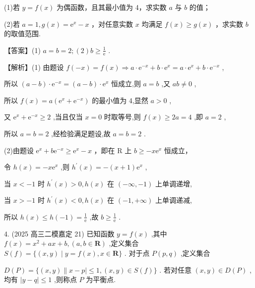 \documentclass[10pt]{article}
\begin{document}
(1)若 \(y = f\left( x\right)\) 为偶函数，且其最小值为 4，求实数 \(a\) 与 \(b\) 的值；

(2)若 \(a = 1,g\left( x\right)  = {\mathrm{e}}^{x} - x\) ，对任意实数 \(x\) 均满足 \(f\left( x\right)  \geq  g\left( x\right)\) ，求实数 \(b\) 的取值范围.

【答案】(1) \(a = b = 2;\left( 2\right) b \geq  \frac{1}{\mathrm{e}}\) .

【解析】(1) 由题设 \(f\left( {-x}\right)  = f\left( x\right)  \Rightarrow  a \cdot  {\mathrm{e}}^{-x} + b \cdot  {\mathrm{e}}^{x} = a \cdot  {\mathrm{e}}^{x} + b \cdot  {\mathrm{e}}^{-x}\) ,

所以 \(\left( {a - b}\right)  \cdot  {\mathrm{e}}^{-x} = \left( {a - b}\right)  \cdot  {\mathrm{e}}^{x}\) 恒成立,则 \(a = b\) ,又 \({ab} \neq  0\) ,

所以 \(f\left( x\right)  = a\left( {{\mathrm{e}}^{x} + {\mathrm{e}}^{-x}}\right)\) 的最小值为 4,显然 \(a > 0\) ,

又 \({\mathrm{e}}^{x} + {\mathrm{e}}^{-x} \geq  2\) ,当且仅当 \(x = 0\) 时取等号,则 \(f\left( x\right)  \geq  {2a} = 4\) ,即 \(a = 2\) ,

所以 \(a = b = 2\) ,经检验满足题设,故 \(a = b = 2\) .

(2)由题设 \({\mathrm{e}}^{x} + b{\mathrm{e}}^{-x} \geq  {\mathrm{e}}^{x} - x\) ，即在 \(\mathrm{R}\) 上 \(b \geq   - x{\mathrm{e}}^{x}\) 恒成立，

令 \(h\left( x\right)  =  - x{\mathrm{e}}^{x}\) ,则 \({h}^{\prime }\left( x\right)  =  - \left( {x + 1}\right) {\mathrm{e}}^{x}\) ,

当 \(x <  - 1\) 时 \({h}^{\prime }\left( x\right)  > 0,h\left( x\right)\) 在 \(\left( {-\infty , - 1}\right)\) 上单调递增,

当 \(x >  - 1\) 时 \({h}^{\prime }\left( x\right)  < 0,h\left( x\right)\) 在 \(\left( {-1, + \infty }\right)\) 上单调递减,

所以 \(h\left( x\right)  \leq  h\left( {-1}\right)  = \frac{1}{\mathrm{e}}\) ,故 \(b \geq  \frac{1}{\mathrm{e}}\) .

4. (2025 高三二模嘉定 21) 已知函数 \(y = f\left( x\right)\) ,其中 \(f\left( x\right)  = {x}^{2} + {ax} + b,\left( {a,b \in  \mathbf{R}}\right)\) ,定义集合 \(S\left( f\right)  = \{ \left( {x,y}\right)  \mid  y = f\left( x\right) ,x \in  \mathbf{R}\}\) . 对于点 \(P\left( {p,q}\right)\) ,定义集合

\(D\left( P\right)  = \{ \left( {x,y}\right) \parallel x - p \mid   \leq  1,\left( {x,y}\right)  \in  S\left( f\right) \}\) . 若对任意 \(\left( {x,y}\right)  \in  D\left( P\right)\) ,均有 \(\left| {y - q}\right|  \leq  1\) ,则称点 \(P\) 为平衡点.
\end{document}
